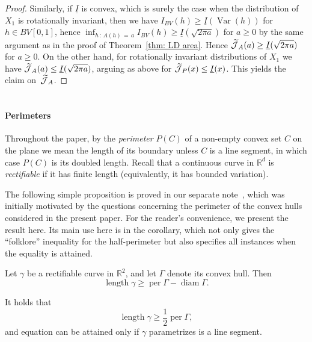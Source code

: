 \documentclass[AHL,Unicode,published]{cedram}
\DeclareMathOperator{\per}{per}
\DeclareMathOperator{\length}{length}
\DeclareMathOperator{\diam}{diam}
\newcommand{\ubar}[1]{\underline{#1}}
\newcommand{\Rbb}{\mathbb{R}}
\newcommand{\Jcl}{\mathcal{J}}
\newcommand{\Var}{\mathop{\mathrm{Var}}\nolimits}
\let\oldtilde\tilde
\renewcommand*{\tilde}[1]{\mathchoice{\widetilde{#1}}{\widetilde{#1}}{\oldtilde{#1}}{\oldtilde{#1}}}
\begin{document}
\begin{proof}
Similarly, if $\ubar I$ is convex, which is surely the case when the distribution of $X_1$ is rotationally invariant, then we have $I_{BV}(h) \ge \ubar I(\Var(h))$ for $h \in BV[0,1]$, hence $\inf_{h\,:\,A(h)\,=\,a} I_{BV}(h) \ge \ubar I (\sqrt{2 \pi a})$ for $a \ge 0$ by the same argument as in the proof of Theorem~\ref{thm: LD area}. Hence $\tilde{\Jcl}_A(a) \ge \ubar I (\sqrt{2 \pi a})$ for $a \ge 0$. On the other hand, for rotationally invariant distributions of $X_1$ we have $\tilde{\Jcl}_A(a) \le \ubar I (\sqrt{2 \pi a})$, arguing as above for $\tilde{\Jcl}_P(x) \le \ubar I(x)$. This yields the claim on~$\tilde{\Jcl}_A $.
\end{proof}

\appendix
\section{}
\paragraph{Perimeters}

Throughout the paper, by the \emph{perimeter} $P(C)$ of a non-empty convex set $C$ on the plane we mean the length of its boundary unless $C$ is a line segment, in which case $P(C)$ is its doubled length. Recall that a continuous curve in $\Rbb^d$ is \emph{rectifiable} if it has finite length (equivalently, it has bounded variation).

The following simple proposition is proved in our separate note~\cite{AkopyanVysotskyGeometry}, which was initially motivated by the questions concerning the perimeter of the convex hulls considered in the present paper. For the reader's convenience, we present the result here. Its main use here is in the corollary, which not only gives the ``folklore'' inequality for the half-perimeter but also specifies all instances when the equality is attained.


\begin{prop}\label{prop:length of curve}
Let $\gamma$ be a rectifiable curve in $\Rbb^2$, and let $\Gamma$ denote its convex hull. Then
\[
\length \gamma \geq \per \Gamma - \diam \Gamma.
\]
\end{prop}

\goodbreak
\begin{coro}\label{cor:length of curve}
It holds that
\[
\length \gamma \geq \frac12 \per \Gamma,
\]
and equation can be attained only if $\gamma$ parametrizes is a line segment.
\end{coro}
\end{document}
